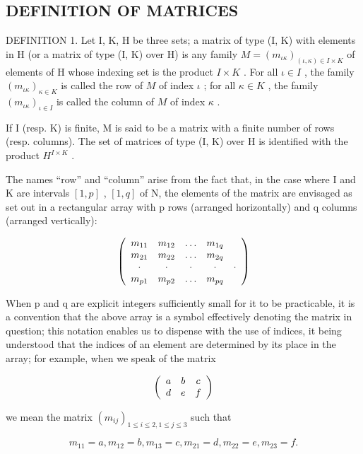 \subsection{DEFINITION OF MATRICES}

DEFINITION 1. Let I, K, H be three sets; a matrix of type (I, K) with elements in H (or a matrix of type (I, K) over H) is any family \(M = (m_{\iota\kappa})_{(\iota, \kappa) \in I \times K}\) of elements of H whose indexing set is the product \(I \times K\) . For all \(\iota \in I\) , the family \((m_{\iota\kappa})_{\kappa \in K}\) is called the row of \(M\) of index \(\iota\) ; for all \(\kappa \in K\) , the family \((m_{\iota\kappa})_{\iota \in I}\) is called the column of \(M\) of index \(\kappa\) .

If I (resp. K) is finite, M is said to be a matrix with a finite number of rows (resp. columns). The set of matrices of type (I, K) over H is identified with the product \(H^{I \times K}\) .

The names ``row'' and ``column'' arise from the fact that, in the case where I and K are intervals \([1,p]\) , \([1,q]\) of N, the elements of the matrix are envisaged as set out in a rectangular array with p rows (arranged horizontally) and q columns (arranged vertically):

\[
\left( \begin{array}{c c c c c} m _ {1 1} & m _ {1 2} & \ldots & m _ {1 q} \\ m _ {2 1} & m _ {2 2} & \ldots & m _ {2 q} \\ \cdot & \cdot & \cdot & \cdot & \cdot \\ m _ {p 1} & m _ {p 2} & \ldots & m _ {p q} \end{array} \right)
\]

When p and q are explicit integers sufficiently small for it to be practicable, it is a convention that the above array is a symbol effectively denoting the matrix in question; this notation enables us to dispense with the use of indices, it being understood that the indices of an element are determined by its place in the array; for example, when we speak of the matrix

\[
\left( \begin{array}{c c c} a & b & c \\ d & e & f \end{array} \right)
\]

we mean the matrix \((m_{ij})_{1\leqslant i\leqslant 2,1\leqslant j\leqslant 3}\) such that

\[
m _ {1 1} = a, m _ {1 2} = b, m _ {1 3} = c, m _ {2 1} = d, m _ {2 2} = e, m _ {2 3} = f.
\]

